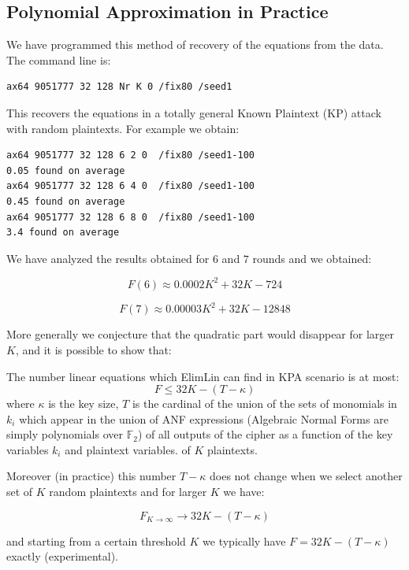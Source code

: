 \subsection{Polynomial Approximation in Practice}

We have programmed this method of recovery of the equations from the data.
The command line is:


\begin{verbatim}
ax64 9051777 32 128 Nr K 0 /fix80 /seed1
\end{verbatim}

This recovers the equations in a totally general Known Plaintext (KP) attack with random
plaintexts.
For example we obtain:
\begin{verbatim}
ax64 9051777 32 128 6 2 0  /fix80 /seed1-100
0.05 found on average
ax64 9051777 32 128 6 4 0  /fix80 /seed1-100
0.45 found on average
ax64 9051777 32 128 6 8 0  /fix80 /seed1-100
3.4 found on average
\end{verbatim}

We have analyzed the results obtained for $6$ and $7$ rounds
and we obtained:

\vskip-4pt
\vskip-4pt
$$
F(6)\approx 0.0002 K^2 + 32 K - 724
$$
\vskip-4pt

\vskip-4pt
\vskip-4pt
$$
F(7)\approx 0.00003 K^2 + 32 K - 12848
$$
\vskip-4pt

More generally we conjecture that the quadratic part would disappear for larger $K$, and it is possible to show that:

\begin{lemma}
	\label{Lem:UppBoundKP}
	The number linear equations which ElimLin can find in KPA scenario
	is at most:
	$$
	F \leq 32 K - (T-\kappa)
	$$
	where $\kappa$ is the key size,
	$T$ is the cardinal of the union of the sets of monomials in $k_i$
	which appear in the union of ANF expressions
	(Algebraic Normal Forms are simply polynomials over $\mathbb{F}_2$)
	of all outputs of the cipher as a function
	of the key variables $k_i$ and plaintext variables. %
	of $K$ plaintexts.
	
	Moreover (in practice) this number $T-\kappa$
	does not change when we select another set of $K$
	random plaintexts and for larger $K$ we have:
	
	$$
	F_{K\to\infty } \to 32 K - (T-\kappa)
	$$
	
	and starting from a certain threshold $K$ we typically have $F = 32 K - (T-\kappa)$ exactly (experimental).
	
\end{lemma}

